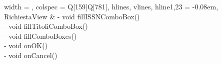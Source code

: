 \begin{longtblr}[
    label = none,
    entry = none,
  ]{
    width = \linewidth,
    colspec = {Q[159]Q[781]},
    hlines,
    vlines,
    hline{1,23} = {-}{0.08em},
  }
  RichiestaView          & {- void fillISSNComboBox()\\- void fillTitoliComboBox()\\- void fillComboBoxes()\\- void onOK()\\- void onCancel()}                                                                                                                                                                                                                                                                                                                                                                                                                                                                                                                                                                                                                                                                                                                                                                                                                                                                                                                                                                                                                                                                                                                                                                                                                                                                                                                                                                                                                                                                                                                                                                                                                                                                                                                                                                             \\

\end{longtblr}
